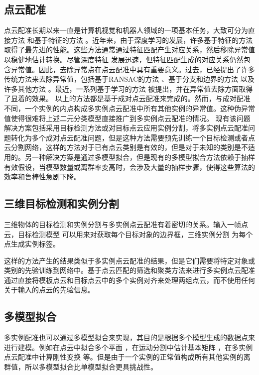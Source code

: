 \subsection{点云配准}
点云配准长期以来一直是计算机视觉和机器人领域的一项基本任务，大致可分为直接方法 \cite{besl1992method, pomerleau2015review} 和基于特征的方法 \cite{qi2017pointnet,huang2021predator,bai2021pointdsc} 。近年来，由于深度学习的发展，许多基于特征的方法取得了最先进的性能。这些方法通常通过特征匹配产生对应关系，然后移除异常值以稳健地估计转换。尽管深度特征 \cite{qi2017pointnet,huang2021predator,bai2021pointdsc, wang2022you} 发展迅速，但特征匹配生成的对应关系仍然包含异常值。因此，去除异常点在点云配准中具有重要意义。过去，已经提出了许多传统方法来去除异常值，包括基于RANSAC的方法 \cite{barath2021progressive,zhao2021progressive,barath2018graph} 、基于分支和边界的方法 \cite{kluger2020consac} 以及许多其他方法 \cite{huang2021predator,yang2020teaser} 。最近，一系列基于学习的方法 \cite{bai2020d3feat,yi2018learning} 被提出，并在异常值去除方面取得了显着的效果。
以上的方法都是基于成对点云配准来完成的。然而，与成对配准不同，一个实例的内点构成多实例点云配准中所有其他实例的异常值。这种伪异常值使得很难将上述二元分类模型直接推广到多实例点云配准的情况。
现有该问题解决方案包括采用目标检测方法或对目标点云应用实例分割，将多实例点云配准问题转化为多个成对点云配准问题，但是这种方法需要预先训练一个目标检测或者点云分割网络，这样的方法对于已有点云类别是有效的，但是对于未知的类别是不适用的。另一种解决方案是通过多模型拟合，但是现有的多模型拟合方法依赖于抽样有效假设，当模型数量或离群率变高时，会涉及大量的抽样步骤，使得这些算法的效率和鲁棒性急剧下降。

\subsection{三维目标检测和实例分割}
三维物体的目标检测和实例分割与多实例点云配准有着密切的关系。输入一帧点云，目标检测模型 \cite{qi2019deep} 可以用来对获取每个目标对象的边界框，三维实例分割 \cite{wang2018sgpn,han2020occuseg} 为每个点生成实例标签。

这样的方法产生的结果类似于多实例点云配准的结果，但是它们需要将特定对象或类别的先验训练到网络中。基于点云匹配的筛选和聚类方法来进行多实例点云配准通过直接将模板点云和目标点云中的多个实例对齐来处理两组点云，而不使用任何关于输入的点云的先验信息。

\subsection{多模型拟合}
多实例配准也可以通过多模型拟合来实现，其目的是根据多个模型生成的数据点来进行建模。例如在点云中拟合多个平面 \cite{barath2018multi} ，在运动分割中估计基本矩阵 \cite{hartley1997defense} ，在多实例点云配准中计算刚性变换 \cite{tang2022multi} 等。但是由于一个实例的正常值构成所有其他实例的离群值，所以多模型拟合比单模型拟合更具挑战性。

